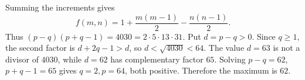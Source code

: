 Summing the increments gives
\[
f(m,n)=1+\dfrac{m(m-1)}{2}-\dfrac{n(n-1)}{2}.
\]
Thus $(p-q)(p+q-1)=4030=2\cdot5\cdot13\cdot31$. Put $d=p-q>0$. Since $q\ge1$, the second factor is $d+2q-1>d$, so $d<\sqrt{4030}<64$. The value $d=63$ is not a divisor of $4030$, while $d=62$ has complementary factor $65$. Solving $p-q=62$, $p+q-1=65$ gives $q=2,p=64$, both positive. Therefore the maximum is $\boxed{62}$.
